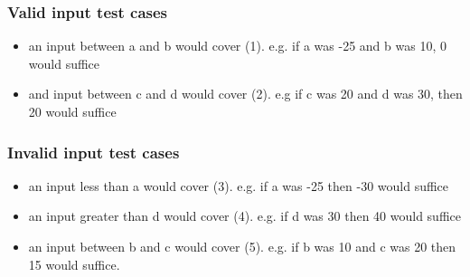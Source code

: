 \documentclass[letterpaper]{article}
\begin{document}
\subsubsection*{Valid input test cases}
\begin{itemize}
	\item an input between a and b would cover (1). e.g. if a was -25 and b
		was 10, 0 would suffice
	\item and input between c and d would cover (2). e.g if c was 20 and d
		was 30, then 20 would suffice
\end{itemize}

\subsubsection*{Invalid input test cases}
\begin{itemize}
	\item an input less than a would cover (3). e.g. if a was -25 then -30
		would suffice
	\item an input greater than d would cover (4). e.g. if d was 30 then 40
		would suffice
	\item an input between b and c would cover (5). e.g. if b was 10 and c
		was 20 then 15 would suffice.
\end{itemize}
\end{document}
